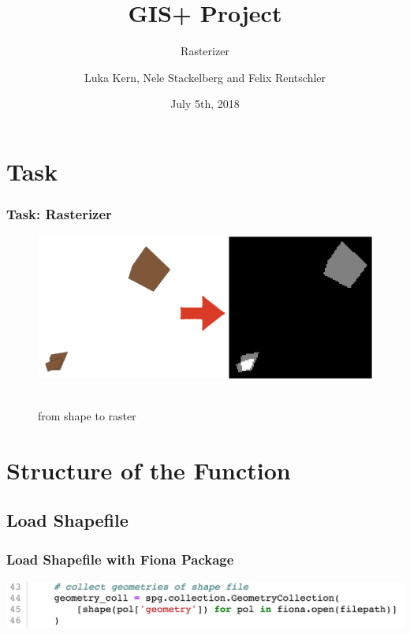 \documentclass[12pt]{beamer}
\begin{document}
\title[]{\textbf{GIS+ Project}}   
\subtitle{Rasterizer}
\author[]{Luka Kern, Nele Stackelberg and Felix Rentschler}
\date{July 5th, 2018}

\begin{frame}
\titlepage
\end{frame}


\section{Task} 
\begin{frame}\frametitle{Task: Rasterizer}
\hspace{0.5cm}
\begin{figure}
\includegraphics[scale=0.20]{rasterizer.png}\

\caption{from shape to raster}
\end{figure}
\end{frame}

\section{Structure of the Function}


\subsection{Load Shapefile}
\begin{frame}\frametitle{Load Shapefile with Fiona Package}

\includegraphics[scale=0.27]{fiona2.png}
\end{frame}
\end{document}
